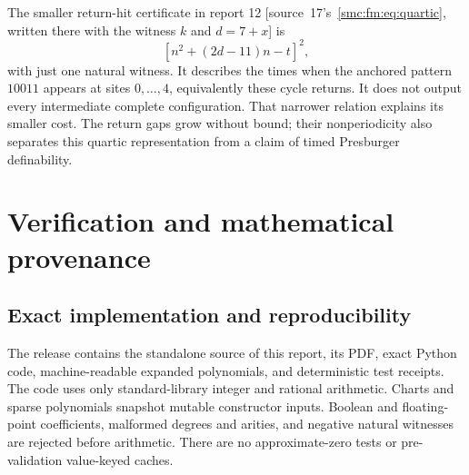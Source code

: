 \documentclass[11pt,letterpaper]{article}
\numberwithin{equation}{section}
\theoremstyle{definition}
\theoremstyle{remark}
\begin{document}
The smaller return-hit certificate in report 12 \textup{[source~17's~\eqref{smc:fm:eq:quartic}, written there with the witness $k$ and $d=7+x$]} is
\[
 [n^2+(2d-11)n-t]^2,
\]
with just one natural witness. It describes the times when the anchored
pattern $10011$ appears at sites $0,\ldots,4$, equivalently these cycle
returns. It does not output every intermediate complete configuration.
That narrower relation explains its smaller cost. The return gaps grow
without bound; their nonperiodicity also separates this quartic
representation from a claim of timed Presburger definability.

\section{Verification and mathematical provenance}\label{smc:tq:sec:checks}
\subsection{Exact implementation and reproducibility}
The release contains the standalone source of this report, its PDF, exact
Python code, machine-readable expanded polynomials, and deterministic test
receipts. The code uses only standard-library integer and rational
arithmetic. Charts and sparse polynomials snapshot mutable constructor
inputs. Boolean and floating-point coefficients, malformed degrees and
arities, and negative natural witnesses are rejected before arithmetic.
There are no approximate-zero tests or pre-validation value-keyed caches.
\end{document}
